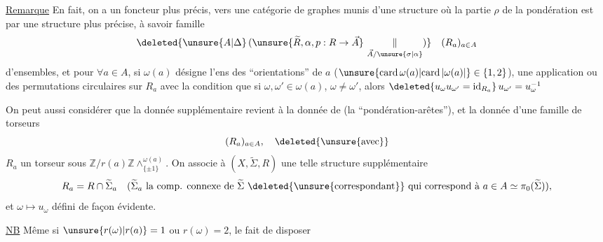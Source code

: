 \uline{Remarque} En fait, on a un foncteur plus précis, vers une catégorie de graphes munis d'une structure où la partie $\rho$ de la pondération est   par une structure plus précise, à savoir   famille
\[
\deleted{\unsure{A|\Delta}\,(\unsure{\widetilde R,\alpha,p:R\to\vec A}\ \underset{\vec A/\unsure{\sigma|\alpha}}{\Vert})}\quad (R_a)_{a\in A}
\]
d'ensembles, et pour $\forall a\in A$, si $\omega(a)$ désigne l'ens des ``orientations'' de $a$ ($\unsure{\mathrm{card}\,\omega(a)|\mathrm{card}\,|\omega(a)|}\in\{1,2\}$), une application
ou des permutations circulaires sur $R_{a}$
avec la condition que si $\omega,\omega'\in\omega(a)$, $\omega\ne\omega'$, alors $\deleted{u_{\omega}u_{\omega'}=\mathrm{id}_{R_{a}}}\,u_{\omega'}=u_{\omega}^{-1}$

On peut aussi considérer que la donnée supplémentaire revient à la donnée de
(la ``pondération-arêtes''), et la donnée d'une famille de torseurs
\[
(R_{a})_{a\in A},\quad \deleted{\unsure{\text{avec}}}
\]
$R_a$ un torseur sous $\mathbb{Z}/r(a)\mathbb{Z}\wedge_{\{\pm1\}}^{\omega(a)}$. On associe à $(X,\widetilde{\Sigma},R)$ une telle structure supplémentaire
\[
R_{a}=R\cap\widetilde{\Sigma}_{a}\quad
(\widetilde{\Sigma}_{a}\ \text{la comp. connexe de }\widetilde{\Sigma}\
\deleted{\unsure{\text{correspondant}}}\ \text{qui correspond à } a\in A\simeq\pi_{0}(\widetilde{\Sigma})),
\]
et $\omega\mapsto u_{\omega}$ défini de façon évidente.

\uline{NB} Même si $\unsure{r(\omega)|r(a)}=1$ ou $r(\omega)=2$, le fait de disposer
